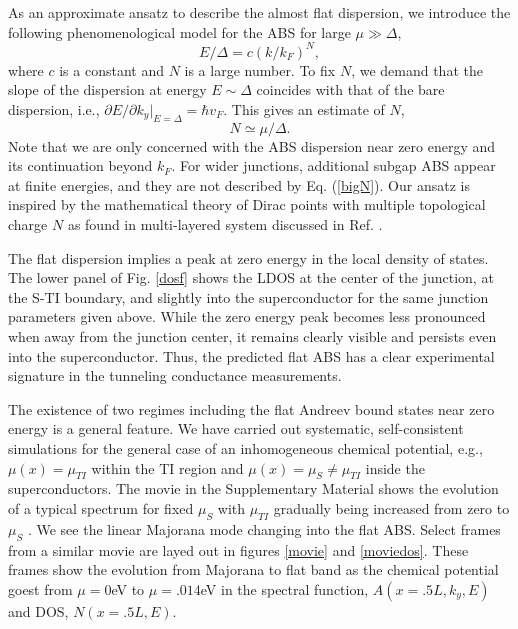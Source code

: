 As an approximate ansatz to describe the almost flat dispersion, we introduce the 
following phenomenological model for the ABS for large $\mu\gg \Delta$, 
\begin{equation}
E/\Delta = c (k/k_F)^N,
\label{bigN}
\end{equation}
where $c$ is a constant and $N$ is a large number. To fix $N$, we demand that
the slope of the dispersion at energy $E\sim \Delta$ coincides with that of the bare
dispersion, i.e., $\partial E/\partial k_y|_{E=\Delta}=\hbar v_F$. This gives an estimate
of $N$,
\begin{equation}
N\simeq \mu/\Delta.
\end{equation}
Note that we are only concerned with the ABS dispersion near zero energy and its continuation beyond $k_F$. 
For wider junctions, additional subgap ABS appear at finite energies,
and they are not described by Eq. (\ref{bigN}). Our ansatz is inspired by the 
mathematical theory of Dirac points with multiple topological charge $N$ as found in multi-layered
system discussed in Ref. \cite{flat-N}.

The flat dispersion implies a peak at zero energy in the local density of states. The lower panel of 
Fig. \ref{dosf} shows the LDOS at the center of the junction, at the S-TI boundary, and slightly into
the superconductor for the same junction parameters given above. 
While the zero energy peak becomes less pronounced when away from the junction center, 
it remains clearly visible and persists even into the superconductor. Thus, the predicted flat ABS has a clear
experimental signature in the tunneling conductance measurements.


The existence of two regimes including the flat Andreev bound states near zero energy is a general
feature. We have carried out systematic, self-consistent simulations for the 
general case of an inhomogeneous chemical potential, e.g., $\mu(x)=\mu_{TI}$ 
within the TI region and $\mu(x)=\mu_S\neq \mu_{TI}$ inside the superconductors.
The movie in the Supplementary Material shows the evolution of a typical spectrum for fixed 
$\mu_S$ with $\mu_{TI}$ gradually being increased from zero to $\mu_S$ \cite{footnote2}.
We see the linear Majorana mode changing into the flat ABS.
Select frames from a similar movie are layed out in figures \ref{movie} and \ref{moviedos}. These frames show the evolution from Majorana to flat band as the chemical potential goest from $\mu=0$eV to $\mu=.014$eV in the spectral function, $A(x=.5L,k_y,E)$ and DOS, $N(x=.5L,E)$.

